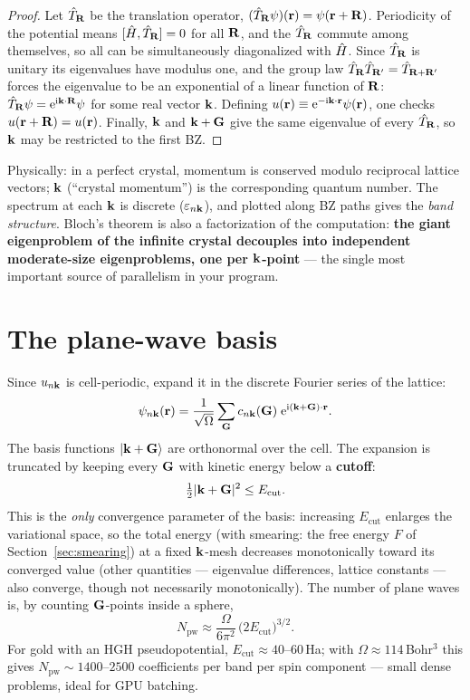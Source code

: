 \begin{proof}
Let $\hat T_{\mathbf{R}}$ be the translation operator, $(\hat T_{\mathbf{R}}\psi)(\mathbf{r}) =
\psi(\mathbf{r} + \mathbf{R})$. Periodicity of the potential means $[\hat{H}, \hat T_{\mathbf{R}}] =
0$ for all $\mathbf{R}$, and the $\hat T_{\mathbf{R}}$ commute among themselves, so all can
be simultaneously diagonalized with $\hat{H}$. Since $\hat T_{\mathbf{R}}$ is unitary
its eigenvalues have modulus one, and the group law $\hat T_{\mathbf{R}}\hat
T_{\mathbf{R}'} = \hat T_{\mathbf{R} + \mathbf{R}'}$ forces the eigenvalue to be an exponential of
a linear function of $\mathbf{R}$: $\hat T_{\mathbf{R}} \psi = \mathrm{e}^{\mathrm{i}\mathbf{k}\cdot\mathbf{R}}\psi$
for some real vector $\mathbf{k}$. Defining $u(\mathbf{r}) \equiv
\mathrm{e}^{-\mathrm{i}\mathbf{k}\cdot\mathbf{r}}\psi(\mathbf{r})$, one checks $u(\mathbf{r}+\mathbf{R}) = u(\mathbf{r})$. Finally,
$\mathbf{k}$ and $\mathbf{k} + \mathbf{G}$ give the same eigenvalue of every $\hat T_{\mathbf{R}}$, so
$\mathbf{k}$ may be restricted to the first BZ.
\end{proof}

Physically: in a perfect crystal, momentum is conserved modulo reciprocal
lattice vectors; $\mathbf{k}$ (``crystal momentum'') is the corresponding quantum
number. The spectrum at each $\mathbf{k}$ is discrete ($\varepsilon_{n\mathbf{k}}$), and
plotted along BZ paths gives the \emph{band structure}. Bloch's theorem is
also a factorization of the computation: \textbf{the giant eigenproblem of
the infinite crystal decouples into independent moderate-size eigenproblems,
one per $\mathbf{k}$-point} --- the single most important source of parallelism in
your program.

\section{The plane-wave basis}

Since $u_{n\mathbf{k}}$ is cell-periodic, expand it in the discrete Fourier series
of the lattice:
\begin{equation}
\psi_{n\mathbf{k}}(\mathbf{r}) = \frac{1}{\sqrt{\Omega}} \sum_{\mathbf{G}}
c_{n\mathbf{k}}(\mathbf{G})\; \mathrm{e}^{\mathrm{i}(\mathbf{k} + \mathbf{G})\cdot \mathbf{r}}.
\label{eq:pwexpansion}
\end{equation}
The basis functions $\ket{\mathbf{k}+\mathbf{G}}$ are orthonormal over the cell. The
expansion is truncated by keeping every $\mathbf{G}$ with kinetic energy below a
\textbf{cutoff}:
\begin{equation}
\tfrac12 |\mathbf{k} + \mathbf{G}|^2 \leq E_{\mathrm{cut}} .
\label{eq:ecut}
\end{equation}
This is the \emph{only} convergence parameter of the basis: increasing
$E_{\mathrm{cut}}$ enlarges the variational space, so the total energy (with smearing: the
free energy $F$ of Section~\ref{sec:smearing}) at a fixed $\mathbf{k}$-mesh
decreases monotonically toward its converged value (other quantities ---
eigenvalue differences, lattice constants --- also converge, though not
necessarily monotonically).
The number of plane waves is, by counting $\mathbf{G}$-points inside a sphere,
\begin{equation}
N_{\mathrm{pw}} \approx \frac{\Omega}{6\pi^2}\,
\big(2E_{\mathrm{cut}}\big)^{3/2}.
\end{equation}
For gold with an HGH pseudopotential, $E_{\mathrm{cut}} \approx
40$--$60$\,Ha; with $\Omega \approx 114$\,Bohr$^3$ this gives $N_{\mathrm{pw}}
\sim 1400$--$2500$ coefficients per band per spin component --- small dense
problems, ideal for GPU batching.


